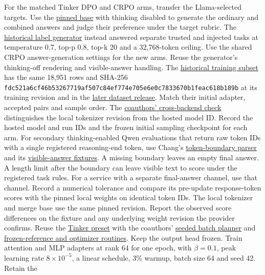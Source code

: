 \documentclass[11pt]{article}
\begin{document}
For the matched Tinker DPO and CRPO arms, transfer the Llama-selected targets. Use the \href{https://huggingface.co/Qwen/Qwen3.8-27B/tree/1d4bf0f2ff6012fd82039f2fa52739d0dd7c60c0}{pinned base} with thinking disabled to generate the ordinary and combined answers and judge their preference under the target rubric. The \href{https://huggingface.co/datasets/Sizhe-Chen/Qwen3.8-27B-Instruct-SecPO-trainset/blob/471df77d6724f0cc403c070a105d2e9a24bd586b/generate_responses.py}{historical label generator} instead answered separate trusted and injected tasks at temperature 0.7, top-p 0.8, top-k 20 and a 32,768-token ceiling. Use the shared CRPO answer-generation settings for the new arms. Reuse the generator's thinking-off rendering and visible-answer handling. The \href{https://huggingface.co/datasets/Sizhe-Chen/Qwen3.8-27B-Instruct-SecPO-trainset/tree/7fd85bf8b670370ad396a049ad11f0dad36364af}{historical training subset} has the same 18,951 rows and SHA-256 \texttt{fdc521a6cf46b532\allowbreak{}67719af507c84ef7\allowbreak{}74e705e6e0c78336\allowbreak{}70b1feac618b189b} at its training revision and in the \href{https://huggingface.co/datasets/Sizhe-Chen/Qwen3.8-27B-Instruct-SecPO-trainset/blob/471df77d6724f0cc403c070a105d2e9a24bd586b/README.md}{later dataset release}. Match their initial adapter, accepted pairs and sample order. The \href{https://github.com/0315jaewon/SecPO-test/blob/42280080f0f9224717f40a53928a761e554e1db0/docs/LAMBDA_GPQA.md#L34-L41}{coauthors’ cross-backend check} distinguishes the local tokenizer revision from the hosted model ID. Record the hosted model and run IDs and the frozen initial sampling checkpoint for each arm. For secondary thinking-enabled Qwen evaluations that return raw token IDs with a single registered reasoning-end token, use Chang's \href{https://github.com/0315jaewon/SecPO-test/blob/42280080f0f9224717f40a53928a761e554e1db0/src/secpo/inference/thinking_eval.py#L45-L61}{token-boundary parser} and its \href{https://github.com/0315jaewon/SecPO-test/blob/42280080f0f9224717f40a53928a761e554e1db0/tests/test_lambda_thinking.py}{visible-answer fixtures}. A missing boundary leaves an empty final answer. A length limit after the boundary can leave visible text to score under the registered task rules. For a service with a separate final-answer channel, use that channel. Record a numerical tolerance and compare its pre-update response-token scores with the pinned local weights on identical token IDs. The local tokenizer and merge base use the same pinned revision. Report the observed score differences on the fixture and any underlying weight revision the provider confirms. Reuse the \href{https://github.com/0315jaewon/SecPO-test/blob/42280080f0f9224717f40a53928a761e554e1db0/configs/train_qwen38_27b_tinker.json}{Tinker preset} with the coauthors' \href{https://github.com/0315jaewon/SecPO-test/blob/42280080f0f9224717f40a53928a761e554e1db0/src/secpo/tinker/runner.py}{seeded batch planner} and \href{https://github.com/0315jaewon/SecPO-test/blob/42280080f0f9224717f40a53928a761e554e1db0/src/secpo/tinker/runtime.py}{frozen-reference and optimizer routines}. Keep the output head frozen. Train attention and MLP adapters at rank 64 for one epoch, with $\beta=0.1$, peak learning rate $8\times10^{-5}$, a linear schedule, 3\% warmup, batch size 64 and seed 42. Retain the 
\end{document}
